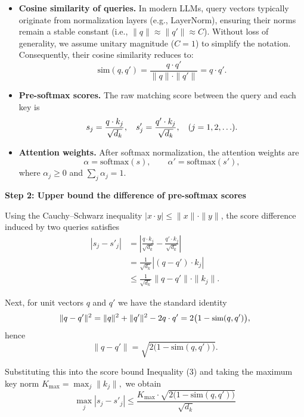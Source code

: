\documentclass[11pt]{article}
\begin{document}
\begin{itemize}
    \item \textbf{Cosine similarity of queries.} In modern LLMs, query vectors typically originate from normalization layers (e.g., LayerNorm), ensuring their norms remain a stable constant (i.e., $\|q\| \approx \|q'\| \approx C$). Without loss of generality, we assume unitary magnitude ($C=1$) to simplify the notation. Consequently, their cosine similarity reduces to:
    $$
    \text{sim}(q,q')=\frac{q\cdot q'}{\|q\|\cdot \|q'\|}=q\cdot q'.
    $$
    
    \item \textbf{Pre-softmax scores.} The raw matching score between the query and each key is
    $$
    \small
    s_j=\frac{q\cdot k_j}{\sqrt{d_k}},\quad 
    s'_j=\frac{q'\cdot k_j}{\sqrt{d_k}},\quad (j=1,2,\ldots).
    $$
    
    \item \textbf{Attention weights.} After softmax normalization, the attention weights are
    $$
    \alpha=\text{softmax}(s),\qquad \alpha'=\text{softmax}(s'),
    $$
    where $\alpha_j\ge 0$ and $\sum_j \alpha_j=1$.
\end{itemize}

\textbf{Step 2: Upper bound the difference of pre-softmax scores}

Using the Cauchy–Schwarz inequality $|x\cdot y|\le \|x\| \cdot \|y\|$,
the score difference induced by two queries satisfies
\begin{equation}
\begin{aligned}
|s_j - s'_j|
&= \left|\frac{q\cdot k_j}{\sqrt{d_k}} - \frac{q'\cdot k_j}{\sqrt{d_k}}\right| \\
&= \frac{1}{\sqrt{d_k}}|(q-q')\cdot k_j| \\
&\le \frac{1}{\sqrt{d_k}}\|q-q'\| \cdot \|k_j\|.
\end{aligned}
\tag{3}
\end{equation}

Next, for unit vectors $q$ and $q'$ we have the standard identity
$$
\small
\|q-q'\|^2
= \|q\|^2 + \|q'\|^2 - 2q\cdot q'
= 2\bigl(1-\text{sim}(q,q')\bigr),
$$
hence
$$
\|q-q'\| = \sqrt{2\bigl(1-\text{sim}(q,q')\bigr)}.
$$

Substituting this into the score bound Inequality (3) and taking the maximum key norm
$K_{\text{max}}=\max_j \|k_j\|,$
we obtain
\begin{equation}
\max_j \left| s_j - s'_j \right|
\le
\frac{ K_{\text{max}} \cdot \sqrt{2\bigl(1-\text{sim}(q,q')\bigr)}}{\sqrt{d_k}}
\tag{4}
\end{equation}
\end{document}

